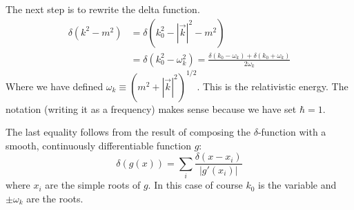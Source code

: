The next step is to rewrite the delta function.
\begin{align*}\delta(k^2-m^2) &= \delta(k_0^2-|\vec{k}|^2-m^2) \\
&= \delta(k_0^2-\omega_k^2) = \frac{\delta(k_0-\omega_k)+\delta(k_0+\omega_k)}{2\omega_k}\end{align*}
Where we have defined $\omega_k \equiv (m^2+|\vec{k}|^2)^{1/2}$. This is the relativistic energy. The notation (writing it as a frequency) makes sense because we have set $\hbar = 1$.

The last equality follows from the result of composing the $\delta$-function with a smooth, continuously differentiable function $g$:
\[ \delta(g(x)) = \sum_i \frac{\delta(x-x_i)}{|g'(x_i)|}\]
where $x_i$ are the simple roots of $g$. In this case of course $k_0$ is the variable and $\pm\omega_k$ are the roots.

